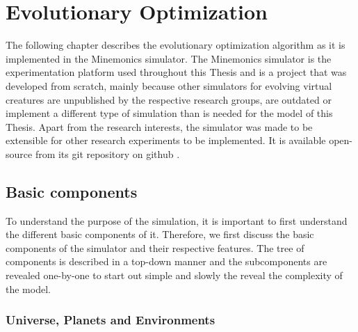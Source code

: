 \documentclass[main]{subfiles}
\begin{document}
\setcounter{chapter}{1}

\chapter{Evolutionary Optimization} %

\label{Chapter\thechapter} %


The following chapter describes the evolutionary optimization algorithm as it is implemented in the Minemonics simulator. The Minemonics simulator is the experimentation platform used throughout this Thesis and is a project that was developed from scratch, mainly because other simulators for evolving virtual creatures are unpublished by the respective research groups, are outdated or implement a different type of simulation than is needed for the model of this Thesis. Apart from the research interests, the simulator was made to be extensible for other research experiments to be implemented. It is available open-source from its git repository on github \cite{bib:Minemonics2016}.

\section{Basic components}

To understand the purpose of the simulation, it is important to first understand the different basic components of it. Therefore, we first discuss the basic components of the simulator and their respective features. The tree of components is described in a top-down manner and the subcomponents are revealed one-by-one to start out simple and slowly the reveal the complexity of the model. 

\subsection{Universe, Planets and Environments}
\end{document}
